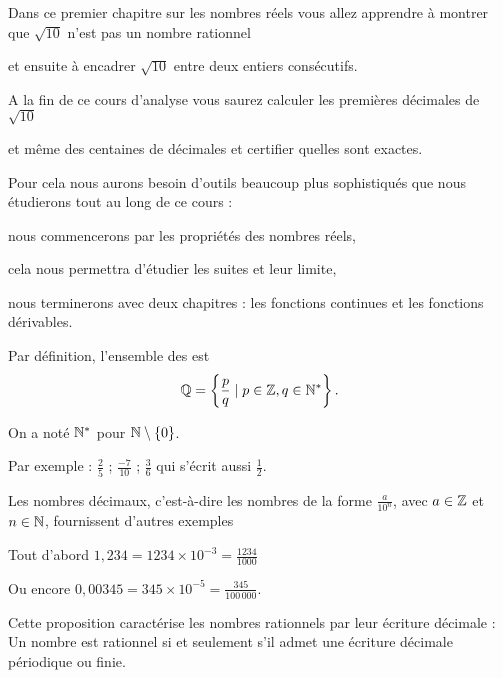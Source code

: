 \change

Dans ce premier chapitre sur les nombres réels 
vous allez apprendre à montrer que $\sqrt{10}$ n'est pas un nombre rationnel

\change

et ensuite à encadrer $\sqrt{10}$ entre deux entiers consécutifs.


A la fin de ce cours d'analyse vous saurez calculer les premières décimales de $\sqrt{10}$

\change

et même des centaines de décimales et certifier quelles sont exactes.

\change

Pour cela nous aurons besoin d'outils beaucoup plus sophistiqués que
nous étudierons tout au long de ce cours :

nous commencerons par les propriétés des nombres réels,

cela nous permettra d'étudier les suites et leur limite,

nous terminerons avec deux chapitres : les fonctions continues et les fonctions dérivables.

\diapo

Par définition, l'ensemble des  est
\[
\mathbb{Q} = \left\{ \frac{p}{q}  \mid p\in \mathbb{Z}, q\in \mathbb{N}^*\right\}.
\]

\change

On a noté $\mathbb{N}^*$ pour $\mathbb{N}\setminus\left\{ 0 \right\}$.

\change

Par exemple : $\frac25$ ; $\frac{-7}{10}$ ; $\frac36$ qui s'écrit aussi $\frac12$. 

\change

Les nombres décimaux, c'est-à-dire les nombres de la forme $\frac{a}{10^n}$, 
avec $a\in \mathbb{Z}$ et $n\in \mathbb{N}$, fournissent d'autres exemples 

\change

Tout d'abord $1,234=1234\times 10^{-3}=\frac{1234}{1000}$

\change

Ou encore $0,00345=345\times 10^{-5}=\frac{345}{100\,000}.$


\diapo

Cette proposition caractérise les nombres rationnels par leur écriture décimale :
Un nombre est rationnel si et seulement s'il admet une écriture décimale périodique ou finie.

